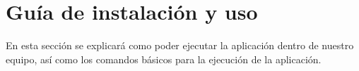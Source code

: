 
\chapter{Guía de instalación y uso}
En esta sección se explicará como poder ejecutar la aplicación dentro de nuestro equipo, así como 
los comandos básicos para la ejecución de la aplicación.

